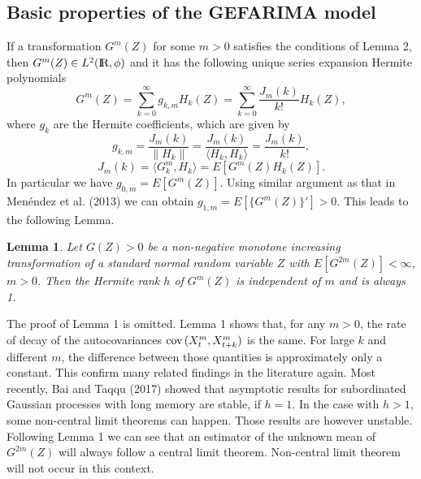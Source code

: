 \documentclass[12pt]{article}
\newtheorem{lemma}{Lemma}
\newcommand\inner[2]{\langle #1, #2 \rangle}
\newcommand{\real}{\mbox{I}\hspace{-2pt}\mbox{R}}
\newcommand{\cov}{\mbox{cov\,}}
\begin{document}

\subsection{Basic properties of the GEFARIMA model}
If a transformation $G^m(Z)$ for some $m>0$ satisfies the conditions of Lemma 2, then $G^m(Z)\in L^2(\real, \phi)$ and it has the following unique series expansion Hermite polynomials
\begin{equation}
G^m(Z)=\sum_{k=0}^\infty g_{k, m} H_k(Z) =\sum_{k=0}^\infty \frac{J_m(k)}{k!} H_k(Z) ,
\end{equation}\label{HEm}
where $g_k$ are the Hermite coefficients, which are given by 
\begin{equation}
g_{k,m}=\frac{J_m(k)}{\left\|H_k\right\|}=\frac{J_m(k)}{\inner{H_k}{H_k}}=\frac{J_m(k)}{k!},
\end{equation}\label{HCm}
\begin{equation}
J_m(k)=\inner{G^m_k}{H_k}=E[G^m(Z)H_k(Z)].
\end{equation}\label{Jkm}
In particular we have $g_{0,m}=E[G^m(Z)]$. Using similar argument as that in Men\'endez et al. (2013) we can obtain $g_{1,m}=E[\{G^m(Z)\}']>0$. This leads to the following Lemma. 
\begin{lemma}
Let $G(Z)>0$ be a non-negative monotone increasing transformation of a standard normal random variable $Z$ with $E[G^{2m}(Z)]<\infty$, $m>0$. Then the Hermite rank $h$ of $G^m(Z)$ is independent of $m$ and is always 1.
\end{lemma}
The proof of Lemma 1 is omitted. Lemma 1 shows that, for any $m>0$, the rate of decay of the autocovariances $\cov(X_t^m, X_{t+k}^m)$ is the same. For large $k$ and different $m$, the difference between those quantities is approximately only a constant. This confirm many related findings in the literature again. Most recently, Bai and Taqqu (2017) showed that asymptotic results for subordinated Gaussian processes with long memory are stable, if $h=1$. In the case with $h>1$, some non-central limit theorems can happen. Those results are however unstable. Following Lemma 1 we can see that an estimator of the unknown mean of $G^{2m}(Z)$ will always follow a central limit theorem. Non-central limit theorem will not occur in this context.  
\end{document}
